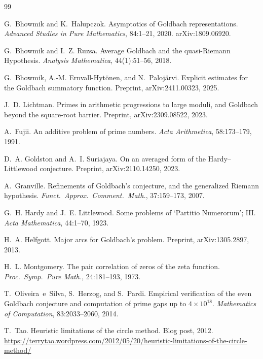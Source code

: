 \documentclass[11pt,a4paper]{article}
\begin{document}


\begin{thebibliography}{99}

G.~Bhowmik and K.~Halupczok.
\newblock Asymptotics of {G}oldbach representations.
\newblock \emph{Advanced Studies in Pure Mathematics}, 84:1--21, 2020.
\newblock arXiv:1809.06920.

G.~Bhowmik and I.~Z. Ruzsa.
\newblock Average {G}oldbach and the quasi-{R}iemann Hypothesis.
\newblock \emph{Analysis Mathematica}, 44(1):51--56, 2018.

G.~Bhowmik, A.-M. Ernvall-Hyt\"onen, and N.~Paloj\"arvi.
\newblock Explicit estimates for the {G}oldbach summatory function.
\newblock Preprint, arXiv:2411.00323, 2025.

J.~D. Lichtman.
\newblock Primes in arithmetic progressions to large moduli, and {G}oldbach beyond the square-root barrier.
\newblock Preprint, arXiv:2309.08522, 2023.

A.~Fujii.
\newblock An additive problem of prime numbers.
\newblock \emph{Acta Arithmetica}, 58:173--179, 1991.

D.~A. Goldston and A.~I. Suriajaya.
\newblock On an averaged form of the {H}ardy--{L}ittlewood conjecture.
\newblock Preprint, arXiv:2110.14250, 2023.

A.~Granville.
\newblock Refinements of {G}oldbach's conjecture, and the generalized {R}iemann hypothesis.
\newblock \emph{Funct.\ Approx.\ Comment.\ Math.}, 37:159--173, 2007.

G.~H. Hardy and J.~E. Littlewood.
\newblock Some problems of `{P}artitio {N}umerorum'; {III}.
\newblock \emph{Acta Mathematica}, 44:1--70, 1923.

H.~A. Helfgott.
\newblock Major arcs for {G}oldbach's problem.
\newblock Preprint, arXiv:1305.2897, 2013.

H.~L. Montgomery.
\newblock The pair correlation of zeros of the zeta function.
\newblock \emph{Proc.\ Symp.\ Pure Math.}, 24:181--193, 1973.

T.~Oliveira~e~Silva, S.~Herzog, and S.~Pardi.
\newblock Empirical verification of the even {G}oldbach conjecture and computation of prime gaps up to $4 \times 10^{18}$.
\newblock \emph{Mathematics of Computation}, 83:2033--2060, 2014.

T.~Tao.
\newblock Heuristic limitations of the circle method.
\newblock Blog post, 2012.
\newblock \url{https://terrytao.wordpress.com/2012/05/20/heuristic-limitations-of-the-circle-method/}

\end{thebibliography}
\end{document}

